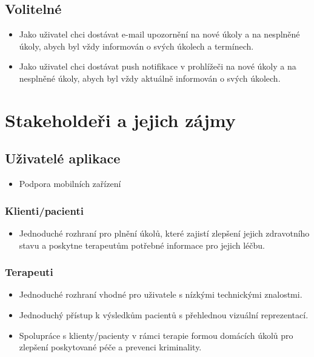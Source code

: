 \subsection{Volitelné}\label{subsec:volitelne}

\begin{itemize}
  \item
  Jako uživatel chci dostávat e-mail upozornění na nové úkoly a na nesplněné úkoly, abych byl vždy informován o svých úkolech a termínech.
  \item
  Jako uživatel chci dostávat push notifikace v prohlížeči na nové úkoly a na nesplněné úkoly, abych byl vždy aktuálně informován o svých úkolech.
\end{itemize}

\section{Stakeholdeři a jejich zájmy}\label{sec:stakeholderi}

\subsection*{Uživatelé aplikace}\label{subsec:uzivatele-aplikace}

\begin{itemize}
  \item
  Podpora mobilních zařízení
\end{itemize}

\subsubsection*{Klienti/pacienti}\label{subsubsec:klientipacienti}

\begin{itemize}
  \item
  Jednoduché rozhraní pro plnění úkolů, které zajistí zlepšení jejich zdravotního stavu a poskytne terapeutům potřebné informace pro jejich léčbu.
\end{itemize}

\subsubsection*{Terapeuti}\label{subsubsec:terapeuti}

\begin{itemize}
  \item
  Jednoduché rozhraní vhodné pro uživatele s nízkými technickými znalostmi.
  \item
  Jednoduchý přístup k výsledkům pacientů s přehlednou vizuální reprezentací.
  \item
  Spolupráce s klienty/pacienty v rámci terapie formou domácích úkolů pro zlepšení poskytované péče a prevenci kriminality.
\end{itemize}

